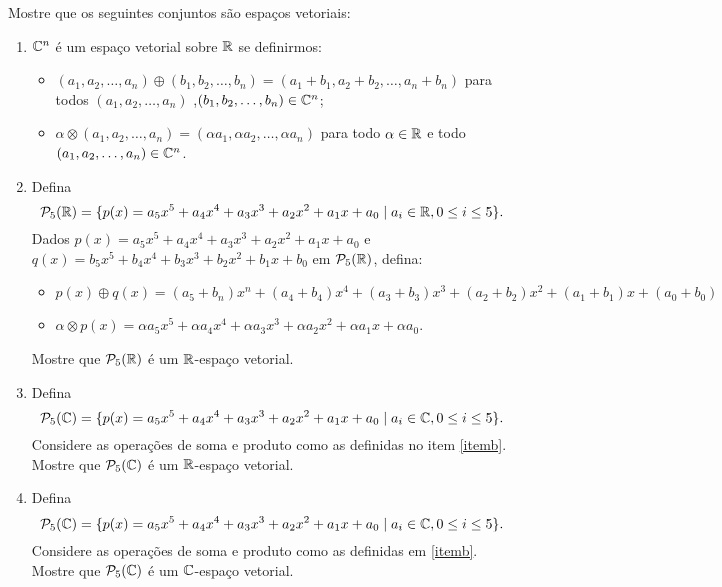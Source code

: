 \documentclass[12pt]{exam}
\begin{document}
\begin{exercicio}
  Mostre que os seguintes conjuntos s\~ao espa\c{c}os vetoriais:
  \begin{enumerate}[label={\alph*})]
    \item $\mathbb{C}^n$ \'e um espa\c{c}o vetorial sobre $\mathbb{R}$ se definirmos:
    \begin{itemize}
      \item $(a_1, a_2, \dots, a_n) \oplus (b_1, b_2, \dots,b_n) = (a_1 + b_1, a_2 + b_2,\dots, a_n + b_n)$ para todos $(a_1, a_2, \dots,a_n)$ ,$(b_1, b_2, \dots,b_n) \in \mathbb{C}^n$;

      \item $\alpha \otimes (a_1, a_2, \dots,a_n) = (\alpha a_1, \alpha a_2, \dots, \alpha a_n)$ para todo $\alpha \in \mathbb{R}$ e todo $(a_1, a_2, \dots, a_n) \in \mathbb{C}^n$.
    \end{itemize}

    \item\label{itemb} Defina
    \[
      \mathcal{P}_5(\mathbb{R}) = \{ p(x) = a_5x^5 + a_4x^4 + a_3x^3 + a_2x^2 + a_1x + a_0 \mid a_i \in \mathbb{R}, 0 \le i \le 5 \}.
    \]
     Dados $p(x) = a_5x^5 + a_4x^4 + a_3x^3 + a_2x^2 + a_1x + a_0$ e $q(x) = b_5x^5 + b_4x^4 + b_3x^3 + b_2x^2 + b_1x + b_0$ em $\mathcal{P}_5(\mathbb{R})$, defina:
    \begin{itemize}
      \item $p(x) \oplus q(x) =  (a_5 + b_n)x^n + (a_4 + b_4)x^4 + (a_3 + b_ 3)x^3 + (a_2 + b_2)x^2 + (a_1 + b_1)x + (a_0 + b_0)$
      \item $\alpha\otimes p(x) = \alpha a_5x^5 + \alpha a_4x^4 + \alpha a_3x^3 + \alpha a_2x^2 + \alpha a_1x + \alpha a_0$.
    \end{itemize}

   Mostre que $\mathcal{P}_5(\mathbb{R})$ \'e um $\mathbb{R}$-espa\c{c}o vetorial.

    \item Defina
    \[
      \mathcal{P}_5(\mathbb{C}) = \{ p(x) = a_5x^5 + a_4x^4 + a_3x^3 + a_2x^2 + a_1x + a_0 \mid a_i \in \mathbb{C}, 0 \le i \le 5 \}.
    \]
    Considere as opera\c{c}\~oes de soma e produto como as definidas no item \ref{itemb}. Mostre que $\mathcal{P}_5(\mathbb{C})$ \'e um $\mathbb{R}$-espa\c{c}o vetorial.

    \item Defina
    \[
      \mathcal{P}_5(\mathbb{C}) = \{ p(x) = a_5x^5 + a_4x^4 + a_3x^3 + a_2x^2 + a_1x + a_0 \mid a_i \in \mathbb{C}, 0 \le i \le 5 \}.
    \]
    Considere as opera\c{c}\~oes de soma e produto como as definidas em \ref{itemb}. Mostre que $\mathcal{P}_5(\mathbb{C})$ \'e um $\mathbb{C}$-espa\c{c}o vetorial.


\end{enumerate}
\end{exercicio}
\end{document}
